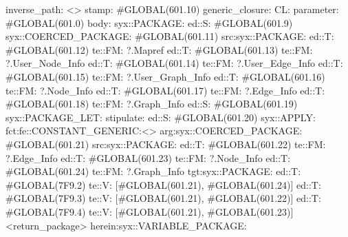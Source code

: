 inverse_path: <>
stamp: #GLOBAL(601.10)
generic_closure:
CL:
parameter: #GLOBAL(601.0)
body: syx::PACKAGE:
        ed::S: #GLOBAL(601.9)
            syx::COERCED_PACKAGE:
                #GLOBAL(601.11)
                 src:syx::PACKAGE:
                        ed::T: #GLOBAL(601.12) te::FM: ?.Mapref
                        ed::T: #GLOBAL(601.13) te::FM: ?.User_Node_Info
                        ed::T: #GLOBAL(601.14) te::FM: ?.User_Edge_Info
                        ed::T: #GLOBAL(601.15) te::FM: ?.User_Graph_Info
                        ed::T: #GLOBAL(601.16) te::FM: ?.Node_Info
                        ed::T: #GLOBAL(601.17) te::FM: ?.Edge_Info
                        ed::T: #GLOBAL(601.18) te::FM: ?.Graph_Info
                            ed::S: #GLOBAL(601.19)
                                syx::PACKAGE_LET:
                                    stipulate:  ed::S: #GLOBAL(601.20)
                                                    syx::APPLY:
                                                        fct:fe::CONSTANT_GENERIC:<>
                                                        arg:syx::COERCED_PACKAGE:
                                                                #GLOBAL(601.21)
                                                                 src:syx::PACKAGE:
                                                                        ed::T: #GLOBAL(601.22) te::FM: ?.Edge_Info
                                                                        ed::T: #GLOBAL(601.23) te::FM: ?.Node_Info
                                                                        ed::T: #GLOBAL(601.24) te::FM: ?.Graph_Info
                                                                tgt:syx::PACKAGE:
                                                                    ed::T: #GLOBAL(7F9.2)
                                                                     te::V:
                                                                     [#GLOBAL(601.21), #GLOBAL(601.24)]
                                                                    ed::T: #GLOBAL(7F9.3)
                                                                     te::V:
                                                                     [#GLOBAL(601.21), #GLOBAL(601.22)]
                                                                    ed::T: #GLOBAL(7F9.4)
                                                                     te::V:
                                                                     [#GLOBAL(601.21), #GLOBAL(601.23)]
                                                 <return_package>
                                    herein:syx::VARIABLE_PACKAGE:
